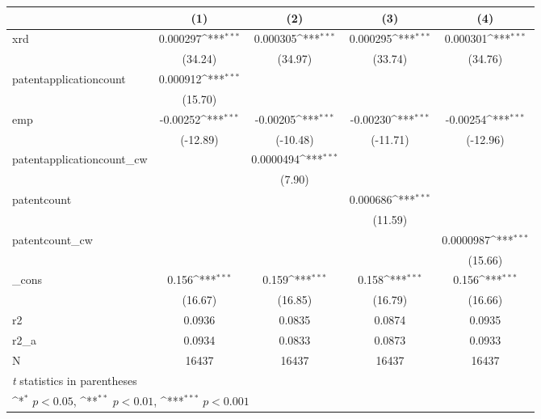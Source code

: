 {
\def\sym#1{\ifmmode^{#1}\else\(^{#1}\)\fi}
\begin{tabular}{l*{4}{c}}
\hline\hline
            &\multicolumn{1}{c}{(1)}         &\multicolumn{1}{c}{(2)}         &\multicolumn{1}{c}{(3)}         &\multicolumn{1}{c}{(4)}         \\
\hline
xrd         &    0.000297\sym{***}&    0.000305\sym{***}&    0.000295\sym{***}&    0.000301\sym{***}\\
            &     (34.24)         &     (34.97)         &     (33.74)         &     (34.76)         \\
[1em]
patentapplicationcount&    0.000912\sym{***}&                     &                     &                     \\
            &     (15.70)         &                     &                     &                     \\
[1em]
emp         &    -0.00252\sym{***}&    -0.00205\sym{***}&    -0.00230\sym{***}&    -0.00254\sym{***}\\
            &    (-12.89)         &    (-10.48)         &    (-11.71)         &    (-12.96)         \\
[1em]
patentapplicationcount\_cw&                     &   0.0000494\sym{***}&                     &                     \\
            &                     &      (7.90)         &                     &                     \\
[1em]
patentcount &                     &                     &    0.000686\sym{***}&                     \\
            &                     &                     &     (11.59)         &                     \\
[1em]
patentcount\_cw&                     &                     &                     &   0.0000987\sym{***}\\
            &                     &                     &                     &     (15.66)         \\
[1em]
\_cons      &       0.156\sym{***}&       0.159\sym{***}&       0.158\sym{***}&       0.156\sym{***}\\
            &     (16.67)         &     (16.85)         &     (16.79)         &     (16.66)         \\
\hline
r2          &      0.0936         &      0.0835         &      0.0874         &      0.0935         \\
r2\_a        &      0.0934         &      0.0833         &      0.0873         &      0.0933         \\
N           &       16437         &       16437         &       16437         &       16437         \\
\hline\hline
\multicolumn{5}{l}{\footnotesize \textit{t} statistics in parentheses}\\
\multicolumn{5}{l}{\footnotesize \sym{*} \(p<0.05\), \sym{**} \(p<0.01\), \sym{***} \(p<0.001\)}\\
\end{tabular}
}
